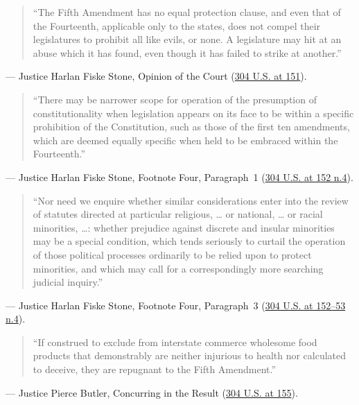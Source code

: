\documentclass[12pt]{article}
\begin{document}
\begin{quote}
``The Fifth Amendment has no equal protection clause, and even that of the Fourteenth, applicable only to the states, does not compel their legislatures to prohibit all like evils, or none. A legislature may hit at an abuse which it has found, even though it has failed to strike at another.''
\end{quote}
\noindent --- Justice Harlan Fiske Stone, Opinion of the Court (\href{https://supreme.justia.com/cases/federal/us/304/144/}{304 U.S. at 151}).

\begin{quote}
``There may be narrower scope for operation of the presumption of constitutionality when legislation appears on its face to be within a specific prohibition of the Constitution, such as those of the first ten amendments, which are deemed equally specific when held to be embraced within the Fourteenth.''
\end{quote}
\noindent --- Justice Harlan Fiske Stone, Footnote Four, Paragraph~1 (\href{https://supreme.justia.com/cases/federal/us/304/144/}{304 U.S. at 152 n.4}).

\begin{quote}
``Nor need we enquire whether similar considerations enter into the review of statutes directed at particular religious, \dots{} or national, \dots{} or racial minorities, \dots{}: whether prejudice against discrete and insular minorities may be a special condition, which tends seriously to curtail the operation of those political processes ordinarily to be relied upon to protect minorities, and which may call for a correspondingly more searching judicial inquiry.''
\end{quote}
\noindent --- Justice Harlan Fiske Stone, Footnote Four, Paragraph~3 (\href{https://supreme.justia.com/cases/federal/us/304/144/}{304 U.S. at 152--53 n.4}).

\begin{quote}
``If construed to exclude from interstate commerce wholesome food products that demonstrably are neither injurious to health nor calculated to deceive, they are repugnant to the Fifth Amendment.''
\end{quote}
\noindent --- Justice Pierce Butler, Concurring in the Result (\href{https://supreme.justia.com/cases/federal/us/304/144/}{304 U.S. at 155}).
\end{document}
